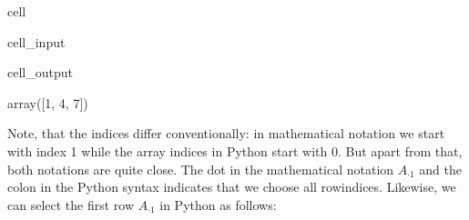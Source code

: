 \documentclass[letterpaper,10pt,english]{jupyterBook}
\begin{document}
\begin{sphinxuseclass}{cell}\begin{sphinxVerbatimInput}

\begin{sphinxuseclass}{cell_input}
\begin{sphinxVerbatim}[commandchars=\\\{\}]
\PYG{p}{[}\PYG{p}{]}
\end{sphinxVerbatim}

\end{sphinxuseclass}\end{sphinxVerbatimInput}
\begin{sphinxVerbatimOutput}

\begin{sphinxuseclass}{cell_output}
\begin{sphinxVerbatim}[commandchars=\\\{\}]
array([1, 4, 7])
\end{sphinxVerbatim}

\end{sphinxuseclass}\end{sphinxVerbatimOutput}

\end{sphinxuseclass}
\sphinxAtStartPar
Note, that the indices differ conventionally: in mathematical notation we start with index 1 while the array indices in Python start with 0. But apart from that, both notations are quite close. The dot in the mathematical notation \(A_{\cdot 1}\) and the colon in the Python syntax  indicates that we choose all row\sphinxhyphen{}indices. Likewise, we can select the first row \(A_{\cdot 1}\) in Python as follows:
\end{document}
